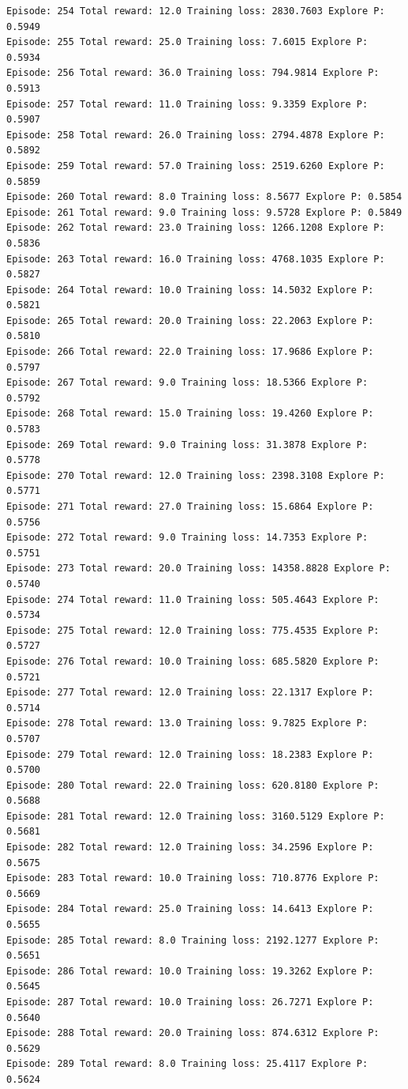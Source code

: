 \documentclass[11pt]{article}
\begin{document}
\begin{Verbatim}[commandchars=\\\{\}]
Episode: 254 Total reward: 12.0 Training loss: 2830.7603 Explore P: 0.5949
Episode: 255 Total reward: 25.0 Training loss: 7.6015 Explore P: 0.5934
Episode: 256 Total reward: 36.0 Training loss: 794.9814 Explore P: 0.5913
Episode: 257 Total reward: 11.0 Training loss: 9.3359 Explore P: 0.5907
Episode: 258 Total reward: 26.0 Training loss: 2794.4878 Explore P: 0.5892
Episode: 259 Total reward: 57.0 Training loss: 2519.6260 Explore P: 0.5859
Episode: 260 Total reward: 8.0 Training loss: 8.5677 Explore P: 0.5854
Episode: 261 Total reward: 9.0 Training loss: 9.5728 Explore P: 0.5849
Episode: 262 Total reward: 23.0 Training loss: 1266.1208 Explore P: 0.5836
Episode: 263 Total reward: 16.0 Training loss: 4768.1035 Explore P: 0.5827
Episode: 264 Total reward: 10.0 Training loss: 14.5032 Explore P: 0.5821
Episode: 265 Total reward: 20.0 Training loss: 22.2063 Explore P: 0.5810
Episode: 266 Total reward: 22.0 Training loss: 17.9686 Explore P: 0.5797
Episode: 267 Total reward: 9.0 Training loss: 18.5366 Explore P: 0.5792
Episode: 268 Total reward: 15.0 Training loss: 19.4260 Explore P: 0.5783
Episode: 269 Total reward: 9.0 Training loss: 31.3878 Explore P: 0.5778
Episode: 270 Total reward: 12.0 Training loss: 2398.3108 Explore P: 0.5771
Episode: 271 Total reward: 27.0 Training loss: 15.6864 Explore P: 0.5756
Episode: 272 Total reward: 9.0 Training loss: 14.7353 Explore P: 0.5751
Episode: 273 Total reward: 20.0 Training loss: 14358.8828 Explore P: 0.5740
Episode: 274 Total reward: 11.0 Training loss: 505.4643 Explore P: 0.5734
Episode: 275 Total reward: 12.0 Training loss: 775.4535 Explore P: 0.5727
Episode: 276 Total reward: 10.0 Training loss: 685.5820 Explore P: 0.5721
Episode: 277 Total reward: 12.0 Training loss: 22.1317 Explore P: 0.5714
Episode: 278 Total reward: 13.0 Training loss: 9.7825 Explore P: 0.5707
Episode: 279 Total reward: 12.0 Training loss: 18.2383 Explore P: 0.5700
Episode: 280 Total reward: 22.0 Training loss: 620.8180 Explore P: 0.5688
Episode: 281 Total reward: 12.0 Training loss: 3160.5129 Explore P: 0.5681
Episode: 282 Total reward: 12.0 Training loss: 34.2596 Explore P: 0.5675
Episode: 283 Total reward: 10.0 Training loss: 710.8776 Explore P: 0.5669
Episode: 284 Total reward: 25.0 Training loss: 14.6413 Explore P: 0.5655
Episode: 285 Total reward: 8.0 Training loss: 2192.1277 Explore P: 0.5651
Episode: 286 Total reward: 10.0 Training loss: 19.3262 Explore P: 0.5645
Episode: 287 Total reward: 10.0 Training loss: 26.7271 Explore P: 0.5640
Episode: 288 Total reward: 20.0 Training loss: 874.6312 Explore P: 0.5629
Episode: 289 Total reward: 8.0 Training loss: 25.4117 Explore P: 0.5624

\end{Verbatim}
\end{document}
